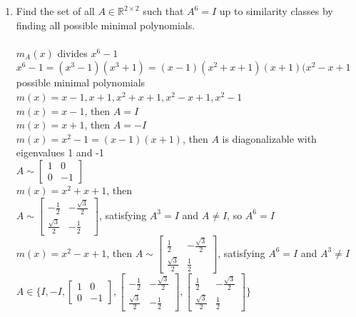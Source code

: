 \documentclass{article}
\begin{document}
{{\begin{enumerate}
\newpage\item Find the set of all $A\in\mathbb{R}^{2\times 2}$ such that $A^6=I$ up to similarity classes by finding all possible minimal polynomials. 
\\
\\$m_A(x)$ divides $x^6-1$
\\$x^6-1=(x^3-1)(x^3+1)=(x-1)(x^2+x+1)(x+1)(x^2-x+1$
\\possible minimal polynomials $m(x)=x-1,x+1,x^2+x+1,x^2-x+1,x^2-1$
\\$m(x)=x-1$, then $A=I$
\\$m(x)=x+1$, then $A=-I$
\\$m(x)=x^2-1=(x-1)(x+1)$, then $A$ is diagonalizable with eigenvalues 1 and -1
\\$A\sim\left[\begin{array}{cc}1&0\\0&-1\end{array}\right]$
\\$m(x)=x^2+x+1$, then 
\\$A\sim\left[\begin{array}{cc}-\frac{1}{2}&-\frac{\sqrt{3}}{2}\\\frac{\sqrt{3}}{2}&-\frac{1}{2}\end{array}\right]$, satisfying $A^3=I$ and $A\neq I$, so $A^6=I$
\\$m(x)=x^2-x+1$, then $A\sim\left[\begin{array}{cc}\frac{1}{2}&-\frac{\sqrt{3}}{2}\\\frac{\sqrt{3}}{2}&\frac{1}{2}\end{array}\right]$, satisfying $A^6=I$ and $A^3\neq I$
\\$A\in\{I,-I,\left[\begin{array}{cc}1&0\\0&-1\end{array}\right],\left[\begin{array}{cc}-\frac{1}{2}&-\frac{\sqrt{3}}{2}\\\frac{\sqrt{3}}{2}&-\frac{1}{2}\end{array}\right],\left[\begin{array}{cc}\frac{1}{2}&-\frac{\sqrt{3}}{2}\\\frac{\sqrt{3}}{2}&\frac{1}{2}\end{array}\right]\}$


\end{enumerate}}}
\end{document}
